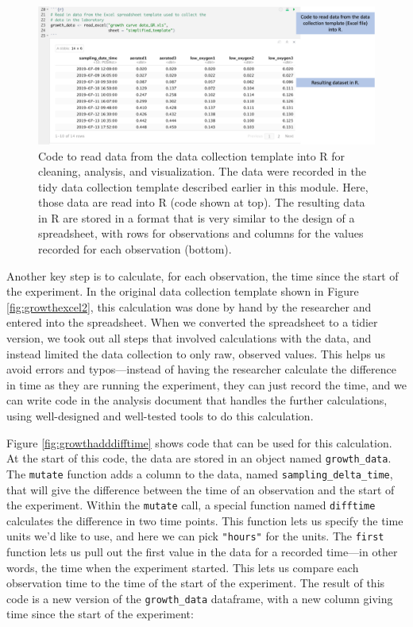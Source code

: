 \documentclass[]{tufte-book}
\begin{document}
\begin{figure}
\includegraphics[width=\textwidth]{figures/growth_curve_readxl} \caption[Code to read data from the data collection template into R for cleaning, analysis, and visualization]{Code to read data from the data collection template into R for cleaning, analysis, and visualization. The data were recorded in the tidy data collection template described earlier in this module. Here, those data are read into R (code shown at top). The resulting data in R are stored in a format that is very similar to the design of a spreadsheet, with rows for observations and columns for the values recorded for each observation (bottom).}\label{fig:growthreadexcel}
\end{figure}

Another key step is to calculate, for each observation, the time since the start
of the experiment. In the original data collection template shown in Figure
\ref{fig:growthexcel2}, this calculation was done by hand by the researcher and
entered into the spreadsheet. When we converted the spreadsheet to a tidier
version, we took out all steps that involved calculations with the data, and
instead limited the data collection to only raw, observed values. This helps us
avoid errors and typos---instead of having the researcher calculate the
difference in time as they are running the experiment, they can just record the
time, and we can write code in the analysis document that handles the further
calculations, using well-designed and well-tested tools to do this calculation.

Figure \ref{fig:growthadddifftime} shows code that can be used for this
calculation. At the start of this code, the data are stored in an object named
\texttt{growth\_data}. The \texttt{mutate} function adds a column to the data, named
\texttt{sampling\_delta\_time}, that will give the difference between the time of an
observation and the start of the experiment. Within the \texttt{mutate} call, a special
function named \texttt{difftime} calculates the difference in two time points. This
function lets us specify the time units we'd like to use, and here we can pick
\texttt{"hours"} for the units. The \texttt{first} function lets us pull out the first value
in the data for a recorded time---in other words, the time when the experiment
started. This lets us compare each observation time to the time of the start of
the experiment. The result of this code is a new version of the \texttt{growth\_data}
dataframe, with a new column giving time since the start of the experiment:
\end{document}
